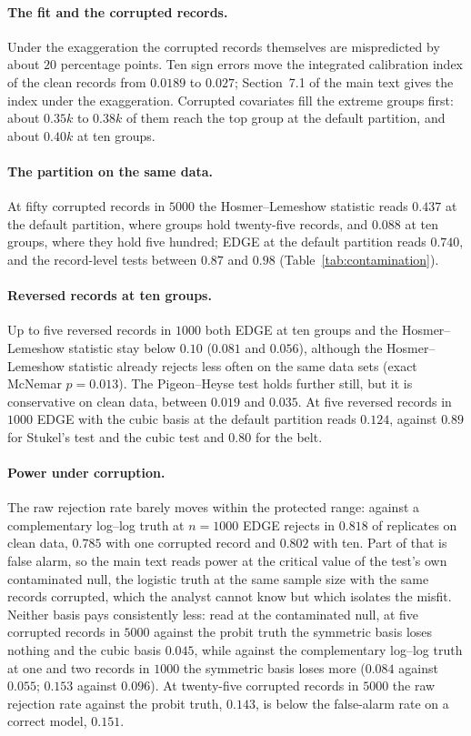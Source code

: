 \documentclass[11pt]{article}
\begin{document}
\paragraph{The fit and the corrupted records.} Under the exaggeration the corrupted records themselves
are mispredicted by about $20$ percentage points. Ten sign errors move the integrated calibration
index of the clean records from $0.0189$ to $0.027$; Section~7.1 of the main text gives the index
under the exaggeration. Corrupted covariates
fill the extreme groups first: about $0.35k$ to $0.38k$ of them reach the top group at the default
partition, and about $0.40k$ at ten groups.

\paragraph{The partition on the same data.} At fifty corrupted records in $5000$ the Hosmer--Lemeshow
statistic reads $0.437$ at the default partition, where groups hold twenty-five records, and $0.088$ at
ten groups, where they hold five hundred; EDGE at the default partition reads $0.740$, and the
record-level tests between $0.87$ and $0.98$ (Table~\ref{tab:contamination}).

\paragraph{Reversed records at ten groups.} Up to five reversed records in $1000$ both EDGE at ten
groups and the Hosmer--Lemeshow statistic stay below $0.10$ ($0.081$ and $0.056$), although the
Hosmer--Lemeshow statistic already rejects less often on the same data sets (exact McNemar $p=0.013$).
The Pigeon--Heyse test holds further still, but it is conservative on clean data, between $0.019$ and
$0.035$. At five reversed records in $1000$ EDGE with the cubic basis at the default partition reads
$0.124$, against $0.89$ for Stukel's test and the cubic test and $0.80$ for the belt.

\paragraph{Power under corruption.} The raw rejection rate barely moves within the protected range:
against a complementary log--log truth at $n=1000$ EDGE rejects in $0.818$ of replicates on clean data,
$0.785$ with one corrupted record and $0.802$ with ten. Part of that is false alarm, so the main text
reads power at the critical value of the test's own contaminated null, the logistic truth at the same
sample size with the same records corrupted, which the analyst cannot know but which isolates the
misfit. Neither basis pays consistently less: read at the contaminated null, at five corrupted records
in $5000$ against the probit truth the symmetric basis loses nothing and the cubic basis $0.045$, while
against the complementary log--log truth at one and two records in $1000$ the symmetric basis loses
more ($0.084$ against $0.055$; $0.153$ against $0.096$). At twenty-five corrupted records in $5000$ the
raw rejection rate against the probit truth, $0.143$, is below the false-alarm rate on a correct model,
$0.151$.
\end{document}
